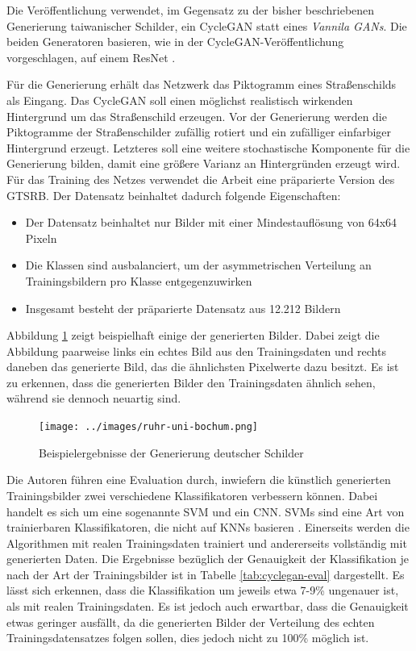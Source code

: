 Die Veröffentlichung verwendet, im Gegensatz zu der bisher beschriebenen Generierung taiwanischer Schilder, ein \ac{CycleGAN} statt eines \emph{Vannila \acp{GAN}}. Die beiden Generatoren basieren, wie in der \ac{CycleGAN}-Veröffentlichung vorgeschlagen, auf einem ResNet \cite{cycleGAN}. \cite{GTSRB} \cite{gtsrbGAN}

Für die Generierung erhält das Netzwerk das Piktogramm eines Straßenschilds als Eingang. Das \ac{CycleGAN} soll einen möglichst realistisch wirkenden Hintergrund um das Straßenschild erzeugen. Vor der Generierung werden die Piktogramme der Straßenschilder zufällig rotiert und ein zufälliger einfarbiger Hintergrund erzeugt. Letzteres soll eine weitere stochastische Komponente für die Generierung bilden, damit eine größere Varianz an Hintergründen erzeugt wird. Für das Training des Netzes verwendet die Arbeit eine präparierte Version des \ac{GTSRB}. Der Datensatz beinhaltet dadurch folgende Eigenschaften:
\begin{itemize}
    \item Der Datensatz beinhaltet nur Bilder mit einer Mindestauflösung von 64x64 Pixeln
    \item Die Klassen sind ausbalanciert, um der asymmetrischen Verteilung an Trainingsbildern pro Klasse entgegenzuwirken
    \item Insgesamt besteht der präparierte Datensatz aus 12.212 Bildern
  \end{itemize}
\cite{gtsrbGAN}

Abbildung \ref{fig:ruhr-uni-bochum} zeigt beispielhaft einige der generierten Bilder. Dabei zeigt die Abbildung paarweise links ein echtes Bild aus den Trainingsdaten und rechts daneben das generierte Bild, das die ähnlichsten Pixelwerte dazu besitzt. Es ist zu erkennen, dass die generierten Bilder den Trainingsdaten ähnlich sehen, während sie dennoch neuartig sind. \cite{gtsrbGAN}

\begin{figure}[h]
    \centering
    \texttt{[image: ../images/ruhr-uni-bochum.png]}
    \caption{Beispielergebnisse der Generierung deutscher Schilder \cite{gtsrbGAN}}
    \label{fig:ruhr-uni-bochum}
\end{figure}

Die Autoren führen eine Evaluation durch, inwiefern die künstlich generierten Trainingsbilder zwei verschiedene Klassifikatoren verbessern können. Dabei handelt es sich um eine sogenannte \ac{SVM} und ein \ac{CNN}. \acp{SVM} sind eine Art von trainierbaren Klassifikatoren, die nicht auf \acp{KNN} basieren \cite{visualApproach}. Einerseits werden die Algorithmen mit realen Trainingsdaten trainiert und andererseits vollständig mit generierten Daten. Die Ergebnisse bezüglich der Genauigkeit der Klassifikation je nach der Art der Trainingsbilder ist in Tabelle \ref{tab:cyclegan-eval} dargestellt. Es lässt sich erkennen, dass die Klassifikation um jeweils etwa 7-9\% ungenauer ist, als mit realen Trainingsdaten. Es ist jedoch auch erwartbar, dass die Genauigkeit etwas geringer ausfällt, da die generierten Bilder der Verteilung des echten Trainingsdatensatzes folgen sollen, dies jedoch nicht zu 100\% möglich ist. \cite{gtsrbGAN}

